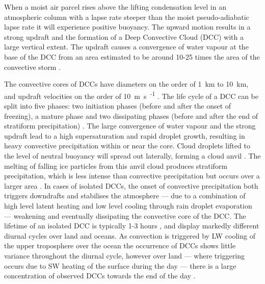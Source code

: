 When a moist air parcel rises above the lifting condensation level in an atmospheric column with a lapse rate steeper than the moist pseudo-adiabatic lapse rate it will experience positive buoyancy.
The upward motion results in a strong updraft and the formation of a Deep Convective Cloud (DCC) with a large vertical extent.
The updraft causes a convergence of water vapour at the base of the DCC from an area estimated to be around 10-25 times the area of the convective storm \citep{trenberth_changing_2003}.

The convective cores of DCCs have diameters on the order of \SI{1}{\kilo\meter} to \SI{10}{\kilo\meter}, and updraft velocities on the order of \SI{10}{\meter\second\textsuperscript{-1}} \citep{weisman_mesoscale_2015}.
The life cycle of a DCC can be split into five phases: two initiation phases (before and after the onset of freezing), a mature phase and two dissipating phases (before and after the end of stratiform precipitation) \citep{wall_life_2018}.
The large convergence of water vapour and the strong updraft lead to a high supersaturation and rapid droplet growth, resulting in heavy convective precipitation within or near the core.
Cloud droplets lifted to the level of neutral buoyancy will spread out laterally, forming a cloud anvil \citep{houze_chapter_2014}. 
The melting of falling ice particles from this anvil cloud produces stratiform precipitation, which is less intense than convective precipitation but occurs over a larger area \citep{houze_stratiform_1997}.
In cases of isolated DCCs, the onset of convective precipitation both triggers downdrafts and stabilises the atmosphere --- due to a combination of high level latent heating and low level cooling through rain droplet evaporation --- weakening and eventually dissipating the convective core of the DCC.
The lifetime of an isolated DCC is typically 1-3 hours \citep{chen_diurnal_1997}, and display markedly different diurnal cycles over land and oceans. 
As convection is triggered by LW cooling of the upper troposphere over the ocean the occurrence of DCCs shows little variance throughout the diurnal cycle, however over land --- where triggering occurs due to SW heating of the surface during the day --- there is a large concentration of observed DCCs towards the end of the day \citep{taylor_evaluating_2017}.

